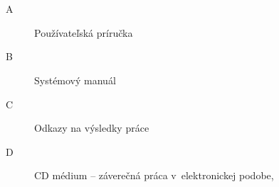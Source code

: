 
\chapter*{\appendixlistname}

\begin{description}
	\item[\appendixname{} A] Používateľská príručka
    \item[\appendixname{} B] Systémový manuál
    \item[\appendixname{} C] Odkazy na výsledky práce
    \item[\appendixname{} D] CD médium -- záverečná práca v~elektronickej podobe,
\end{description}
